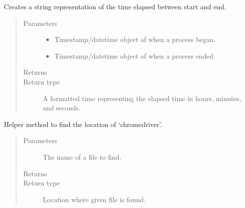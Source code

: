 \documentclass[letterpaper,10pt,english]{sphinxmanual}
\begin{document}

\begin{fulllineitems}
\label{\detokenize{index:ListManagement.utility.general.duration}}
Creates a string representation of the time elapsed between start and end.
\begin{quote}\begin{description}
\item[{Parameters}] \leavevmode\begin{itemize}
\item {} 
 \textendash{} Timestamp/datetime object of when a process began.

\item {} 
 \textendash{} Timestamp/datetime object of when a process ended.

\end{itemize}

\item[{Returns}] \leavevmode


\item[{Return type}] \leavevmode
A formatted time representing the elapsed time in hours, minutes, and seconds.

\end{description}\end{quote}

\end{fulllineitems}


\begin{fulllineitems}
\label{\detokenize{index:ListManagement.utility.general.find_chrome_driver_location}}
Helper method to find the location of ‘chromedriver’.
\begin{quote}\begin{description}
\item[{Parameters}] \leavevmode
{} \textendash{} The name of a file to find.

\item[{Returns}] \leavevmode


\item[{Return type}] \leavevmode
Location where given file is found.

\end{description}\end{quote}

\end{fulllineitems}
\end{document}
